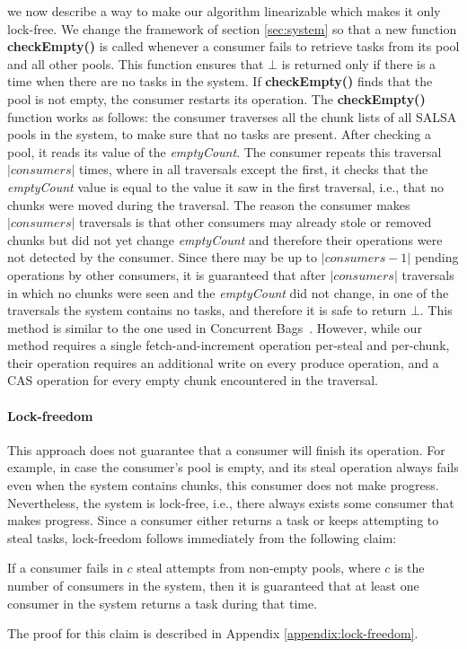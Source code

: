 we now describe a way to make our algorithm linearizable which makes it only lock-free. 
We change the framework of section \ref{sec:system} so that a new function {\bf checkEmpty()} is called whenever a consumer fails to retrieve tasks from its pool and all other pools. This function ensures that $\bot$ is returned only if there is a time when there are no tasks in the system. If {\bf checkEmpty()} finds that the pool is not empty, the consumer restarts its operation. The {\bf checkEmpty()} function works as follows: the consumer traverses all the chunk lists of all SALSA pools in the system, to make sure that no tasks are present. After checking a pool, it reads its value of the \emph{emptyCount}. The consumer repeats this traversal $|consumers|$ times, where in all traversals except the first, it checks that the \emph{emptyCount} value is equal to the value it saw in the first traversal, i.e., that no chunks were moved during the traversal. The reason the consumer makes $|consumers|$ traversals is that other consumers may already stole or removed chunks but did not yet change \emph{emptyCount} and therefore their operations were not detected by the consumer. Since there may be up to $|consumers-1|$ pending operations by other consumers, it is guaranteed that after $|consumers|$ traversals in which no chunks were seen and the \emph{emptyCount} did not change, in one of the traversals the system contains no tasks, and therefore it is safe to return $\bot$. This method is similar to the one used in Concurrent Bags~\cite{Sundell:2011:LAC:1989493.1989550}. However, while our method requires a single fetch-and-increment operation per-steal and per-chunk, their operation requires an additional write on every produce operation, and a CAS operation for every empty chunk encountered in the traversal.

\paragraph{Lock-freedom}
This approach does not guarantee that a consumer will finish its operation. For example, in case the consumer's pool is empty, and its steal operation always fails even when the system contains chunks, this consumer does not make progress. Nevertheless, the system is lock-free, i.e., there always exists some consumer that makes progress. Since a consumer either returns a task or keeps attempting to steal tasks, lock-freedom follows immediately from the following claim:

\begin{claim}
\label{claim:lock-free}
If a consumer fails in $c$ steal attempts from non-empty pools, where $c$ is the number of consumers in the system, then it is guaranteed that at least one consumer in the system returns a task during that time. 
\end{claim}
The proof for this claim is described in Appendix \ref{appendix:lock-freedom}.